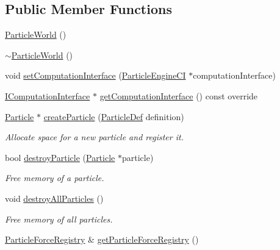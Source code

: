\subsection*{Public Member Functions}
\begin{DoxyCompactItemize}
\item 
\mbox{\hyperlink{classr3_1_1_particle_world_a5cd4bf68559cd0e1194420d3233b095e}{Particle\+World}} ()
\item 
\mbox{\hyperlink{classr3_1_1_particle_world_a3a6d6f87b726156c41d4282c6dbb1e48}{$\sim$\+Particle\+World}} ()
\item 
void \mbox{\hyperlink{classr3_1_1_particle_world_adf5630d53659e9ced254d33990f15a9d}{set\+Computation\+Interface}} (\mbox{\hyperlink{classr3_1_1_particle_engine_c_i}{Particle\+Engine\+CI}} $\ast$computation\+Interface)
\item 
\mbox{\hyperlink{classr3_1_1_i_computation_interface}{I\+Computation\+Interface}} $\ast$ \mbox{\hyperlink{classr3_1_1_particle_world_a1e806bf89ec6445a54b9534f1efc081f}{get\+Computation\+Interface}} () const override
\item 
\mbox{\hyperlink{classr3_1_1_particle}{Particle}} $\ast$ \mbox{\hyperlink{classr3_1_1_particle_world_a5df8f4d242ab19e7e1a9830ef6131c3c}{create\+Particle}} (\mbox{\hyperlink{structr3_1_1_particle_def}{Particle\+Def}} definition)
\begin{DoxyCompactList}\small\item\em Allocate space for a new particle and register it. \end{DoxyCompactList}\item 
bool \mbox{\hyperlink{classr3_1_1_particle_world_a1802231868ed6d99dd677ef71328781a}{destroy\+Particle}} (\mbox{\hyperlink{classr3_1_1_particle}{Particle}} $\ast$particle)
\begin{DoxyCompactList}\small\item\em Free memory of a particle. \end{DoxyCompactList}\item 
void \mbox{\hyperlink{classr3_1_1_particle_world_aa061b4eab09216fb7e3a8d08cbdb6dd2}{destroy\+All\+Particles}} ()
\begin{DoxyCompactList}\small\item\em Free memory of all particles. \end{DoxyCompactList}\item 
\mbox{\hyperlink{classr3_1_1_particle_force_registry}{Particle\+Force\+Registry}} \& \mbox{\hyperlink{classr3_1_1_particle_world_aaa3f952fdfd8862673d41afa078245bf}{get\+Particle\+Force\+Registry}} ()

\end{DoxyCompactItemize}
